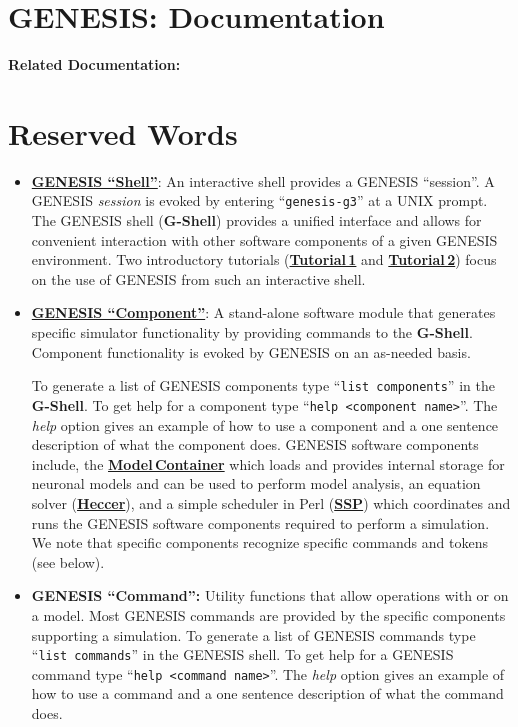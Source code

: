\documentclass[12pt]{article}
\begin{document}
\section*{GENESIS: Documentation}

{\bf Related Documentation:}

\section*{Reserved Words}

\begin{itemize}

\item \href{../gshell/gshell.tex}{\bf GENESIS ``Shell''}: An interactive shell provides a GENESIS ``session''. A GENESIS  {\it session} is evoked by entering ``{\tt genesis-g3}'' at a UNIX prompt. The GENESIS shell ({\bf G-Shell}) provides a unified interface and allows for convenient interaction with other software components of a given GENESIS environment.  Two introductory tutorials (\href{../tutorial1/tutorial1.tex}{\bf Tutorial\,1} and \href{../tutorial2/tutorial2.tex}{\bf Tutorial\,2}) focus on the use of GENESIS from such an interactive shell.

\item \href{../genesis-components/genesis-components.tex}{\bf GENESIS ``Component''}:  A stand-alone software module that generates specific simulator functionality by providing commands to the {\bf G-Shell}. Component functionality is evoked by GENESIS on an as-needed basis.

To generate a list of GENESIS components type ``{\tt list components}'' in the {\bf G-Shell}. To get help for a component type ``{\tt help <component name>}''. The {\it help} option gives an example of how to use a component and a one sentence description of what the component does. GENESIS software components include, the \href{../model-container/model-container.tex}{\bf Model\,Container} which loads and provides internal storage for neuronal models and can be used to perform model analysis, an equation solver (\href{../heccer/heccer.tex}{\bf Heccer}), and a simple scheduler in Perl (\href{../ssp/ssp.tex}{\bf SSP}) which coordinates and runs the GENESIS software components required to perform a simulation. We note that specific components recognize specific commands and tokens (see below).

\item {\bf GENESIS ``Command'':} Utility functions that allow operations with or on a model. Most GENESIS commands are provided by the specific components supporting a simulation. To generate a list of GENESIS commands type ``{\tt list commands}'' in the GENESIS shell. To get help for a GENESIS command type ``{\tt help <command name>}''. The {\it help} option gives an example of how to use a command and a one sentence description of what the command does.


\end{itemize}
\end{document}
